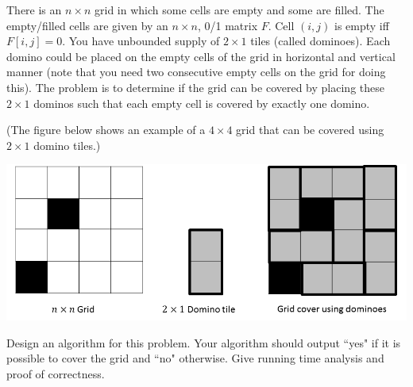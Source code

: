 \documentclass[answers]{exam}
\newenvironment{answer}{%
     \renewcommand{\solutiontitle}{\noindent\textbf{Answer:}\enspace}
     \begin{solution}
     }{%
     \end{solution}
     \renewcommand{\solutiontitle}{\noindent\textbf{Solution:}\enspace}
 }
\begin{document}
\begin{questions}

\question[7]

There is an $n \times n$ grid in which some cells are empty and some are filled. The empty/filled cells are given by an $n \times n$, 0/1 matrix $F$. Cell $(i, j)$ is empty iff $F[i, j] = 0$. You have
    unbounded supply of $2 \times 1$ tiles (called dominoes). Each domino could be placed on the empty cells of the grid in horizontal and vertical manner (note that you need two consecutive empty
    cells on the grid for doing this). The problem is to determine if the grid can be covered by placing these $2 \times 1$ dominos such that each empty cell is covered by exactly one domino.

(The figure below shows an example of a $4 \times 4$ grid that can be covered using $2 \times 1$ domino tiles.)

\begin{center}
    \includegraphics[scale=0.5]{img/domino.png}
\end{center}
Design an algorithm for this problem. Your algorithm should output ``yes" if it is possible to cover the grid and ``no" otherwise. Give running time analysis and proof of correctness.


\end{questions}
\end{document}
